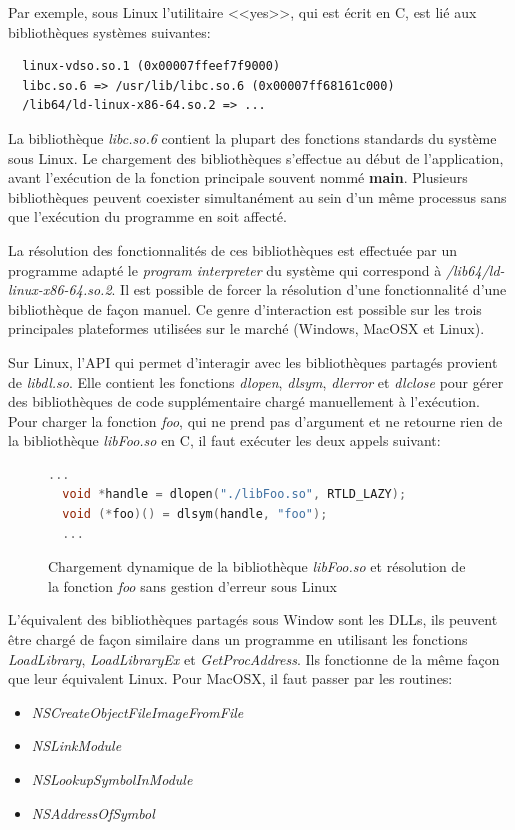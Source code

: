 Par exemple, sous Linux l'utilitaire <<yes>>, qui est écrit en C,
est lié aux bibliothèques systèmes suivantes:
\begin{verbatim}
  linux-vdso.so.1 (0x00007ffeef7f9000)
  libc.so.6 => /usr/lib/libc.so.6 (0x00007ff68161c000)
  /lib64/ld-linux-x86-64.so.2 => ...
\end{verbatim}

La bibliothèque \textit{libc.so.6} contient la plupart des fonctions standards
du système sous Linux.  Le chargement des bibliothèques s'effectue au début de
l'application, avant l'exécution de la fonction principale souvent nommé
\textbf{main}. Plusieurs bibliothèques peuvent coexister simultanément au sein
d'un même processus sans que l'exécution du programme en soit affecté.

La résolution des fonctionnalités de ces bibliothèques est effectuée par un
programme adapté le \textit{program interpreter} du système qui correspond à
\textit{/lib64/ld-linux-x86-64.so.2}.  Il est possible de forcer la résolution
d'une fonctionnalité d'une bibliothèque de façon manuel. Ce genre d'interaction
est possible sur les trois principales plateformes utilisées sur le marché
(Windows, MacOSX et Linux).

Sur Linux, l'API qui permet d'interagir avec les bibliothèques partagés provient de \textit{libdl.so}.
Elle contient les fonctions \textit{dlopen}, \textit{dlsym}, \textit{dlerror} et \textit{dlclose} pour gérer
des bibliothèques de code supplémentaire chargé manuellement à l'exécution.  Pour charger la fonction
\textit{foo}, qui ne prend pas d'argument et ne retourne rien de la bibliothèque \textit{libFoo.so} en C,
il faut exécuter les deux appels suivant:
\begin{center}
  \begin{figure}[ht]
\begin{lstlisting}[language=C,frame=single]
  ...
  void *handle = dlopen("./libFoo.so", RTLD_LAZY);
  void (*foo)() = dlsym(handle, "foo");
  ...
\end{lstlisting}
\caption{Chargement dynamique de la bibliothèque \textit{libFoo.so} et
résolution de la fonction \textit{foo} sans gestion d'erreur sous Linux}
  \end{figure}
\end{center}
L'équivalent des bibliothèques partagés sous Window sont les DLLs, ils peuvent être chargé de façon similaire dans un
programme en utilisant les fonctions \textit{LoadLibrary}, \textit{LoadLibraryEx} et \textit{GetProcAddress}. Ils
fonctionne de la même façon que leur équivalent Linux. Pour MacOSX, il faut passer par les routines:
\begin{itemize}
    \item \textit{NSCreateObjectFileImageFromFile}
    \item \textit{NSLinkModule}
    \item \textit{NSLookupSymbolInModule}
    \item \textit{NSAddressOfSymbol}
\end{itemize}

